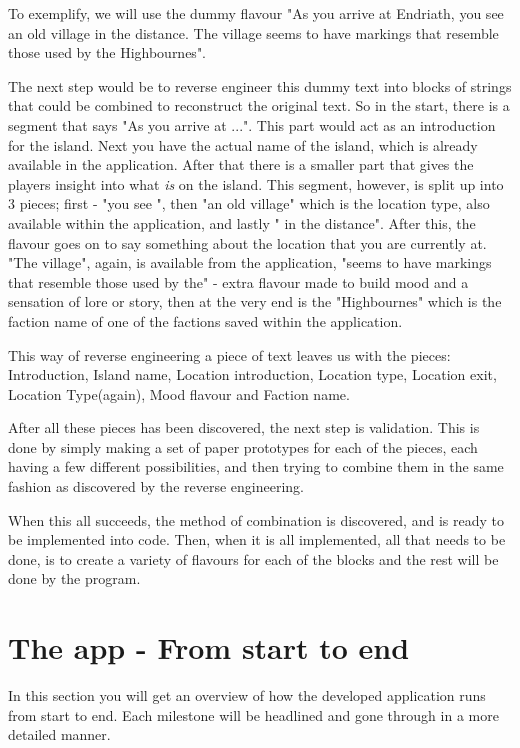 To exemplify, we will use the dummy flavour "As you arrive at Endriath, you see an old village in the distance. The village seems to have markings that resemble those used by the Highbournes".

The next step would be to reverse engineer this dummy text into blocks of strings that could be combined to reconstruct the original text. So in the start, there is a segment that says "As you arrive at ...". This part would act as an introduction for the island. Next you have the actual name of the island, which is already available in the application. After that there is a smaller part that gives the players insight into what \textit{is} on the island. This segment, however, is split up into 3 pieces; first - "you see ", then "an old village" which is the location type, also available within the application, and lastly " in the distance". After this, the flavour goes on to say something about the location that you are currently at. "The village", again, is available from the application, "seems to have markings that resemble those used by the" - extra flavour made to build mood and a sensation of lore or story, then at the very end is the "Highbournes" which is the faction name of one of the factions saved within the application.

This way of reverse engineering a piece of text leaves us with the pieces: Introduction, Island name, Location introduction, Location type, Location exit, Location Type(again), Mood flavour and Faction name.

After all these pieces has been discovered, the next step is validation. This is done by simply making a set of paper prototypes for each of the pieces, each having a few different possibilities, and then trying to combine them in the same fashion as discovered by the reverse engineering. 

When this all succeeds, the method of combination is discovered, and is ready to be implemented into code. Then, when it is all implemented, all that needs to be done, is to create a variety of flavours for each of the blocks and the rest will be done by the program.

\section{The app - From start to end}
In this section you will get an overview of how the developed application runs from start to end. Each milestone will be headlined and gone through in a more detailed manner.

